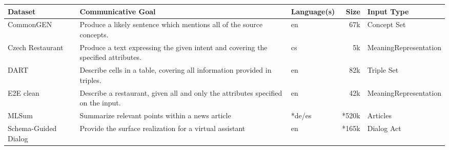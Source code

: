 \documentclass[11pt,a4paper]{article}
\begin{document}
\setlength{\tabcolsep}{4pt}\renewcommand{\arraystretch}{0.75}\begin{table*}[t!]
\small
\begin{tabular}{@{}m{11.9em}m{16.2em}m{5.2em}rm{6em}@{}}
\toprule
\textbf{Dataset} & \textbf{Communicative Goal}  & \centering\arraybackslash \textbf{Language(s)} & \textbf{Size} & \centering\arraybackslash\textbf{Input Type} \\ \toprule
\makecell[bl]{\small{CommonGEN}\\ \small{\citep{lin2019commongen}}} & \small{Produce a likely sentence which mentions all of the source concepts.}  & \centering\arraybackslash\small{en} & \centering\arraybackslash\small{67k} &  \centering\arraybackslash\small{Concept Set} \\ \midrule
\makecell[bl]{\small{Czech Restaurant}\\ \small{\citep{duvsek2019neural}}} & \small{Produce a text expressing the given intent and covering the specified attributes.} & \centering\arraybackslash\small{cs} & \centering\arraybackslash\small{5k} &  \centering\arraybackslash\small{Meaning\quad Representation} \\ \midrule
\makecell[bl]{\small{DART}\\ \small{\citep{radev2020dart}}} & \small{Describe cells in a table, covering all information provided in triples.} & \centering\arraybackslash\small{en} & \small{82k} & \centering\arraybackslash\small{Triple Set} \\ \midrule
\makecell[bl]{\small{E2E clean}\\ \small{\citep{novikova2017e2e}} \\ \small{\citep{duvsek2019semantic}}} & \small{Describe a restaurant, given all and only the attributes specified on the input.} & \centering\arraybackslash\small{en} & \centering\arraybackslash\small{42k}   & \centering\arraybackslash\small{Meaning\quad Representation}  \\ \midrule
\makecell[bl]{\small{MLSum}\\ \small{\citep{scialom2020mlsum}}} & \small{Summarize relevant points within a news article} &  \centering\arraybackslash \small{*de/es} & \centering\arraybackslash\small{*520k}  & \centering\arraybackslash\small{Articles} \\\midrule
\makecell[bl]{\small{Schema-Guided Dialog}\\ \small{\citep{rastogi2019towards}}} & \small{Provide the surface realization for a virtual assistant} & \centering\arraybackslash\small{en} & \centering\arraybackslash\small{*165k}   & \centering\arraybackslash\small{Dialog Act} \\\midrule

\end{tabular}
\end{table*}
\end{document}
